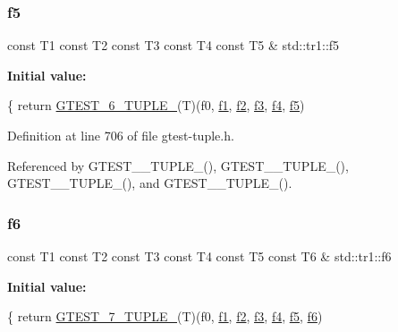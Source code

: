 \subsubsection{\texorpdfstring{f5}{f5}}
{\footnotesize\ttfamily const T1 const T2 const T3 const T4 const T5 \& std\+::tr1\+::f5}

{\bfseries Initial value\+:}
\begin{DoxyCode}
\{
  \textcolor{keywordflow}{return} \hyperlink{gtest-tuple_8h_a53f36c86a979ed8285bf3c6f82f16483}{GTEST\_6\_TUPLE\_}(T)(f0, \hyperlink{namespacestd_1_1tr1_a9c0fa65b105f8e2f58ba59ecf75fd000}{f1}, \hyperlink{namespacestd_1_1tr1_a87dd9e009868361317f587126dba63d4}{f2}, \hyperlink{namespacestd_1_1tr1_a0f7c3b47d27d42d82d1a333ea420ce4e}{f3}, \hyperlink{namespacestd_1_1tr1_adc796e02b7385d526aff708189564f67}{f4}, \hyperlink{namespacestd_1_1tr1_a9c1eb66b2b2fa321942af95405232a0d}{f5})
\end{DoxyCode}


Definition at line 706 of file gtest-\/tuple.\+h.



Referenced by G\+T\+E\+S\+T\+\_\+\_\+\+T\+U\+P\+L\+E\+\_\+(), G\+T\+E\+S\+T\+\_\+\_\+\+T\+U\+P\+L\+E\+\_\+(), G\+T\+E\+S\+T\+\_\+\_\+\+T\+U\+P\+L\+E\+\_\+(), and G\+T\+E\+S\+T\+\_\+\_\+\+T\+U\+P\+L\+E\+\_\+().

\mbox{\label{namespacestd_1_1tr1_a6b62f32e1e3e21bceb94eb46c4cbfd56}} 
\subsubsection{\texorpdfstring{f6}{f6}}
{\footnotesize\ttfamily const T1 const T2 const T3 const T4 const T5 const T6 \& std\+::tr1\+::f6}

{\bfseries Initial value\+:}
\begin{DoxyCode}
\{
  \textcolor{keywordflow}{return} \hyperlink{gtest-tuple_8h_a8987baf82ee028d1d778447413a02c0c}{GTEST\_7\_TUPLE\_}(T)(f0, \hyperlink{namespacestd_1_1tr1_a9c0fa65b105f8e2f58ba59ecf75fd000}{f1}, \hyperlink{namespacestd_1_1tr1_a87dd9e009868361317f587126dba63d4}{f2}, \hyperlink{namespacestd_1_1tr1_a0f7c3b47d27d42d82d1a333ea420ce4e}{f3}, \hyperlink{namespacestd_1_1tr1_adc796e02b7385d526aff708189564f67}{f4}, \hyperlink{namespacestd_1_1tr1_a9c1eb66b2b2fa321942af95405232a0d}{f5}, \hyperlink{namespacestd_1_1tr1_a6b62f32e1e3e21bceb94eb46c4cbfd56}{f6})
\end{DoxyCode}


